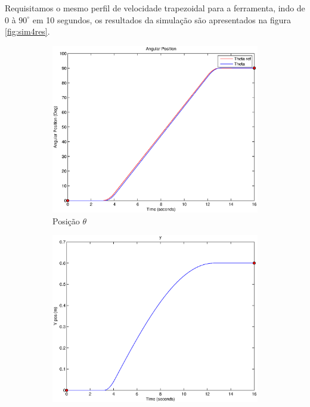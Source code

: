 \documentclass{article}
\begin{document}
Requisitamos o mesmo perfil de velocidade trapezoidal para a ferramenta, indo de $0$ à $90^\circ$ em 10 segundos, os resultados da simulação são apresentados na figura \ref{fig:sim4res}.

\begin{figure}[H]
	\centering
	\begin{subfigure}{0.32\textwidth}
		\includegraphics[width=\linewidth]{matlab/theta4}
		\caption{Posição $\theta$}
	\end{subfigure}
	\begin{subfigure}{0.32\textwidth}
		\includegraphics[width=\linewidth]{matlab/y4}

\end{subfigure}
\end{figure}
\end{document}
